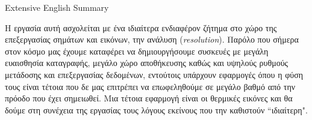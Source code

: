 \pagestyle{plain}
\begin{center}
{\LARGE Extensive English Summary}\\[1cm]
\end{center}

\setlength{\parindent}{24pt} H εργασία αυτή ασχολείται με ένα ιδιαίτερα ενδιαφέρον ζήτημα στο χώρο της επεξεργασίας σημάτων και εικόνων, την ανάλυση (\emph{resolution}). Παρόλο που σήμερα στον κόσμο μας έχουμε καταφέρει να δημιουργήσουμε συσκευές με μεγάλη ευαισθησία καταγραφής, μεγάλο χώρο αποθήκευσης καθώς και υψηλούς ρυθμούς μετάδοσης και επεξεργασίας δεδομένων, εντούτοις υπάρχουν εφαρμογές όπου η φύση τους είναι τέτοια που δε μας επιτρέπει να επωφεληθούμε σε μεγάλο βαθμό από την πρόοδο που έχει σημειωθεί. Μια τέτοια εφαρμογή είναι οι θερμικές εικόνες και θα δούμε στη συνέχεια της εργασίας τους λόγους εκείνους που την καθιστούν ``ιδιαίτερη".
